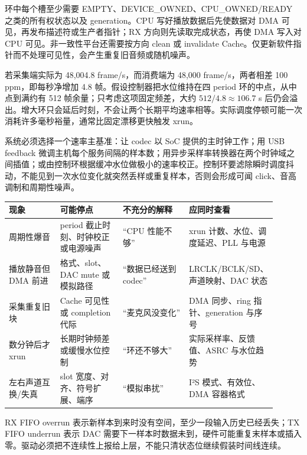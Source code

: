 环中每个槽至少需要 EMPTY、DEVICE\_OWNED、CPU\_OWNED/READY 之类的所有权状态以及 generation。CPU 写好播放数据后先使数据对 DMA 可见，再发布描述符或生产者指针；RX 方向则先读取完成状态，再使 DMA 写入对 CPU 可见。非一致性平台还需要按方向 clean 或 invalidate Cache。仅更新软件指针而不处理可见性，会产生重复旧音频或随机噪声。


若采集端实际为 48,004.8 frame/s，而消费端为 48,000 frame/s，两者相差 100 ppm，即每秒净增加 4.8 帧。假设控制器把水位维持在四 period 环的中点，从中点到满约有 512 帧余量；只考虑这项固定频差，大约 $512/4.8\approx106.7$ s 后仍会溢出。增大环只会延后时刻，不会让两个长期平均速率相等。实际调度停顿可能一次消耗许多毫秒裕量，通常比固定漂移更快触发 xrun。

系统必须选择一个速率主基准：让 codec 以 SoC 提供的主时钟工作；用 USB feedback 微调主机每个服务间隔的样本数；用异步采样率转换器在两个时钟域之间插值；或由控制环根据缓冲水位做极小的速率校正。控制环要滤除瞬时调度抖动，不能见到一次水位变化就突然丢样或重复样本，否则会形成可闻 click、音高调制和周期性噪声。

\begin{longtable}{L{0.2\linewidth}L{0.24\linewidth}L{0.26\linewidth}L{0.2\linewidth}}
\toprule
现象 & 可能停点 & 不充分的解释 & 应同时查看 \\
\midrule
周期性爆音 & period 截止时刻、时钟校正或电源噪声 & “CPU 性能不够” & xrun 计数、水位、调度延迟、PLL 与电源 \\\tablerowrule
播放静音但 DMA 前进 & 格式、slot、DAC mute 或模拟路径 & “数据已经送到 codec” & LRCLK/BCLK/SD、声道映射、DAC 状态 \\\tablerowrule
采集重复旧块 & Cache 可见性或 completion 代际 & “麦克风没变化” & DMA 同步、ring 指针、generation 与序号 \\\tablerowrule
数分钟后才 xrun & 长期时钟频差或缓慢水位控制 & “环还不够大” & 实际采样率、反馈值、ASRC 与水位趋势 \\\tablerowrule
左右声道互换/失真 & slot 宽度、对齐、符号扩展、端序 & “模拟串扰” & I²S 模式、有效位、DMA 容器格式 \\
\bottomrule
\end{longtable}


RX FIFO overrun 表示新样本到来时没有空间，至少一段输入历史已经丢失；TX FIFO underrun 表示 DAC 需要下一样本时数据未到，硬件可能重复末样本或插入零。驱动必须把不连续性上报给上层，不能只清状态位继续假装时间线连续。

